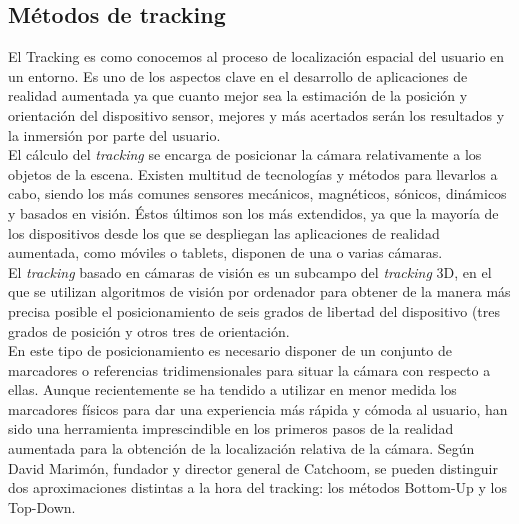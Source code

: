 \subsection{Métodos de tracking}
El Tracking es como conocemos al proceso de localización espacial del usuario en un entorno. Es uno de los aspectos clave en el desarrollo de aplicaciones de realidad aumentada ya que cuanto mejor sea la estimación de la posición y orientación del dispositivo sensor, mejores y más acertados serán los resultados y la inmersión por parte del usuario.\cite{BostanciTrackingMethods}\\
El cálculo del \textit{tracking} se encarga de posicionar la cámara relativamente a los objetos de la escena. Existen multitud de tecnologías y métodos para llevarlos a cabo, siendo los más comunes sensores mecánicos, magnéticos, sónicos, dinámicos y basados en visión. Éstos últimos son los más extendidos, ya que la mayoría de los dispositivos desde los que se despliegan las aplicaciones de realidad aumentada, como móviles o tablets, disponen de una o varias cámaras. \cite{ARToolkit}\\
El \textit{tracking} basado en cámaras de visión es un subcampo del \textit{tracking} 3D, en el que se utilizan algoritmos de visión por ordenador para obtener de la manera más precisa posible el posicionamiento de seis grados de libertad del dispositivo (tres grados de posición y otros tres de orientación.\\
En este tipo de posicionamiento es necesario disponer de un conjunto de marcadores o referencias tridimensionales para situar la cámara con respecto a ellas. Aunque recientemente se ha tendido a utilizar en menor medida los marcadores físicos para dar una experiencia más rápida y cómoda al usuario, han sido una herramienta imprescindible en los primeros pasos de la realidad aumentada para la obtención de la localización relativa de la cámara.
Según David Marimón\cite{TrackingThesis}, fundador y director general de Catchoom, se pueden distinguir dos aproximaciones distintas a la hora del tracking: los métodos Bottom-Up y los Top-Down. 

